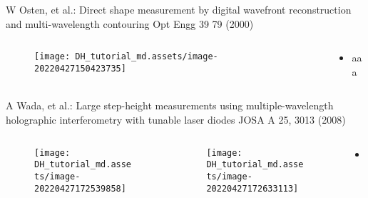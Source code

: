 \documentclass[t, aspectratio=169]{beamer}
\begin{document}
\begin{frame}{W Osten, et al.: Direct shape measurement by digital wavefront reconstruction and multi-wavelength contouring}
	\vspace{-3 mm}
	\small Opt Engg 39 79 (2000)
	\begin{columns}
		\begin{column}{.6\textwidth}
			\begin{figure}
				\texttt{[image: DH\_tutorial\_md.assets/image-20220427150423735]}
			\end{figure}
		\end{column}
		\begin{column}{.4\textwidth}
			\begin{itemize}
				\item aaa
			\end{itemize}
		\end{column}
	\end{columns}
\end{frame}


\begin{frame}{A Wada, et al.: Large step-height measurements using multiple-wavelength holographic interferometry with tunable laser diodes}
	\vspace{-3 mm}
	\small JOSA A 25, 3013 (2008)
	\begin{columns}
		\begin{column}{.45\textwidth}
			\begin{figure}
				\texttt{[image: DH\_tutorial\_md.assets/image-20220427172539858]}
			\end{figure}
		\end{column}
		\begin{column}{.15\textwidth}
			\begin{figure}
				\texttt{[image: DH\_tutorial\_md.assets/image-20220427172633113]}
			\end{figure}
		\end{column}
		\begin{column}{.4\textwidth}
			\begin{itemize}
				\item aaa
			\end{itemize}
		\end{column}
	\end{columns}
\end{frame}
\end{document}
